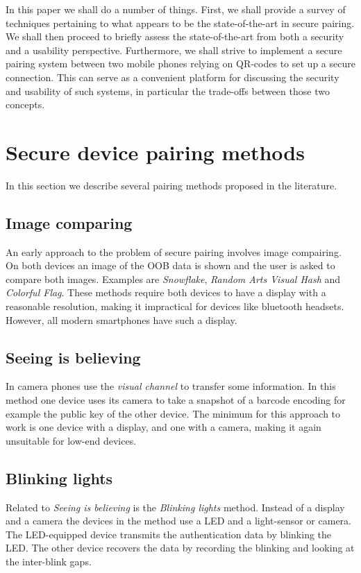 \documentclass[conference, 11pt]{sty/IEEEtran}
\begin{document}
In this paper we shall do a number of things.
First, we shall provide a survey of techniques pertaining to what appears to be the state-of-the-art in secure pairing.
We shall then proceed to briefly assess the state-of-the-art from both a security and a usability perspective.
Furthermore, we shall strive to implement a secure pairing system between two mobile phones relying on QR-codes to set up a secure connection.
This can serve as a convenient platform for discussing the security and usability of such systems, in particular the trade-offs between those two concepts.

\section{Secure device pairing methods}
\label{sec:secure_device_pairing_methods}

In this section we describe several pairing methods proposed in the literature.

\subsection{Image comparing}
An early approach to the problem of secure pairing involves image compairing.
On both devices an image of the OOB data is shown and the user is asked to compare both images.
Examples are \textit{Snowflake}\cite{goldberg1996visual}, \textit{Random Arts Visual Hash}\cite{perrig1999hash} and \textit{Colorful Flag}\cite{dohrmann2002public}.
These methods require both devices to have a display with a reasonable resolution, making it impractical for devices like bluetooth headsets. However, all modern smartphones have such a display.

\subsection{Seeing is believing}
In \cite{mccune2005seeing} camera phones use the \textit{visual channel} to transfer some information. In this method one device uses its camera to take a snapshot of a barcode encoding for example the public key of the other device. The minimum for this approach to work is one device with a display, and one with a camera, making it again unsuitable for low-end devices.

\subsection{Blinking lights}
Related to \textit{Seeing is believing} is the \textit{Blinking lights} method.
Instead of a display and a camera the devices in the method use a LED and a light-sensor or camera.
The LED-equipped device transmits the authentication data by blinking the LED.
The other device recovers the data by recording the blinking and looking at the inter-blink gaps.
\end{document}
